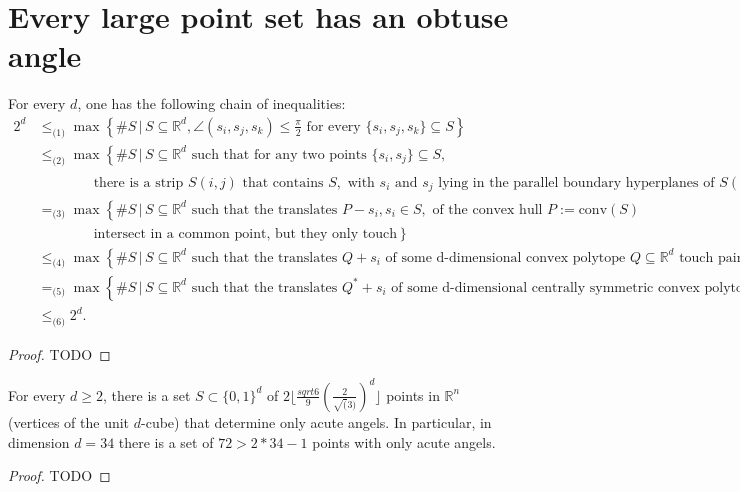 \chapter{Every large point set has an obtuse angle}

\begin{theorem}
  \label{ch17theorem1}
  For every \(d\), one has the following chain of inequalities:
\begin{align}
    2^d &\leq_{\text{(1)}} \max \left\{ \#S \,|\, S \subseteq \mathbb{R}^d, \angle(s_i, s_j, s_k) \leq \frac{\pi}{2} \text{ for every } \{s_i, s_j, s_k\} \subseteq S \right\} \\
    &\leq_{\text{(2)}} \max \left\{ \#S \,|\, S \subseteq \mathbb{R}^d \text{ such that for any two points } \{s_i, s_j\} \subseteq S, \right. \nonumber \\
    &\qquad\qquad \left. \text{there is a strip } S(i, j) \text{ that contains } S, \text{ with } s_i \text{ and } s_j \text{ lying in the parallel boundary hyperplanes of } S(i, j) \right\} \\
    &=_{\text{(3)}} \max \left\{ \#S \,|\, S \subseteq \mathbb{R}^d \text{ such that the translates } P - s_i, s_i \in S, \text{ of the convex hull } P := \text{conv}(S) \right. \nonumber \\
    &\qquad\qquad \left. \text{intersect in a common point, but they only touch} \right\} \\
    &\leq_{\text{(4)}} \max \left\{ \#S \,|\, S \subseteq \mathbb{R}^d \text{ such that the translates } Q + s_i \text{ of some d-dimensional convex polytope } Q \subseteq \mathbb{R}^d \text{ touch pairwise} \right\} \\
    &=_{\text{(5)}} \max \left\{ \#S \,|\, S \subseteq \mathbb{R}^d \text{ such that the translates } Q^* + s_i \text{ of some d-dimensional centrally symmetric convex polytope } Q^* \subseteq \mathbb{R}^d \text{ touch pairwise} \right\} \\
    &\leq_{\text{(6)}} 2^d.
\end{align}
\end{theorem}
\begin{proof}
  TODO
\end{proof}

\begin{theorem}
  \label{ch17theorem2}
  For every \(d\ge 2\), there is a set \(S\subset\{0, 1\}^d\) of \(2\lfloor\frac{sqrt{6}}{9}(\frac{2}{\sqrt(3)})^d\rfloor\)
  points in \(\mathbb{R}^n\) (vertices of the unit \(d\)-cube) that determine only acute angels.
  In particular, in dimension \(d = 34\) there is a set of \(72 > 2*34 - 1\) points
  with only acute angels.
\end{theorem}
\begin{proof}
  TODO
\end{proof}
